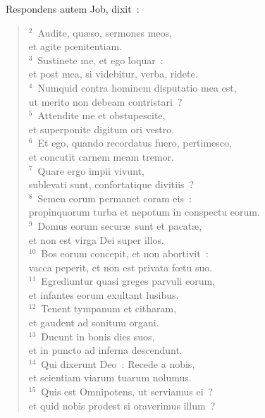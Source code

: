 ~\lettrine[lines=10,image=true,loversize=0.05,lraise=-0.03]{R}{}espondens autem Job, dixit~:
\begin{flushleft}\begin{verse}\vspace{6pt}${}^{2}$~Audite, qu\ae so, sermones meos,\\ et agite pœnitentiam.\\
${}^{3}$~Sustinete me, et ego loquar~:\\ et post mea, si videbitur, verba, ridete.\\
${}^{4}$~Numquid contra hominem disputatio mea est,\\ ut merito non debeam contristari~?\\
${}^{5}$~Attendite me et obstupescite,\\ et superponite digitum ori vestro.\\
${}^{6}$~Et ego, quando recordatus fuero, pertimesco,\\ et concutit carnem meam tremor.\\
${}^{7}$~Quare ergo impii vivunt,\\ sublevati sunt, confortatique divitiis~?\\
${}^{8}$~Semen eorum permanet coram eis~:\\ propinquorum turba et nepotum in conspectu eorum.\\
${}^{9}$~Domus eorum secur\ae\ sunt et pacat\ae ,\\ et non est virga Dei super illos.\\
${}^{10}$~Bos eorum concepit, et non abortivit~:\\ vacca peperit, et non est privata fœtu suo.\\
${}^{11}$~Egrediuntur quasi greges parvuli eorum,\\ et infantes eorum exultant lusibus.\\
${}^{12}$~Tenent tympanum et citharam,\\ et gaudent ad sonitum organi.\\
${}^{13}$~Ducunt in bonis dies suos,\\ et in puncto ad inferna descendunt.\\
${}^{14}$~Qui dixerunt Deo~: Recede a nobis,\\ et scientiam viarum tuarum nolumus.\\
${}^{15}$~Quis est Omnipotens, ut serviamus ei~?\\ et quid nobis prodest si oraverimus illum~?\\

\end{verse}
\end{flushleft}
